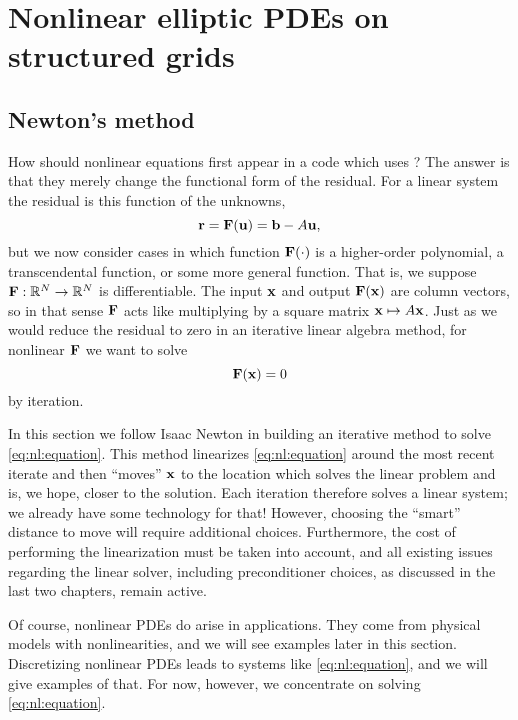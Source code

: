 \renewcommand{\CODELOC}{c/ch4/}

\chapter{Nonlinear elliptic PDEs on structured grids}
\label{chap:nonlinear}

\section{Newton's method}

How should nonlinear equations first appear in a code which uses \PETSc?  The answer is that they merely change the functional form of the residual.  For a linear system the residual is this function of the unknowns,
\begin{equation}
\mathbf{r} = \mathbf{F}(\mathbf{u}) = \mathbf{b} - A \mathbf{u}, \label{eq:nl:linres}
\end{equation}
but we now consider cases in which function $\mathbf{F}(\cdot)$ is a higher-order polynomial, a transcendental function, or some more general function.  That is, we suppose $\mathbf{F} : \mathbb{R}^N \to \mathbb{R}^N$ is differentiable.  The input $\mathbf{x}$ and output $\mathbf{F}(\mathbf{x})$ are column vectors, so in that sense $\mathbf{F}$ acts like multiplying by a square matrix $\mathbf{x}\mapsto A\mathbf{x}$.  Just as we would reduce the residual to zero in an iterative linear algebra method, for nonlinear $\mathbf{F}$ we want to solve
\begin{equation}
   \mathbf{F}(\mathbf{x}) = 0   \label{eq:nl:equation}
\end{equation}
by iteration.

In this section we follow Isaac Newton in building an iterative method to solve \eqref{eq:nl:equation}.  This method linearizes \eqref{eq:nl:equation} around the most recent iterate and then ``moves'' $\mathbf{x}$ to the location which solves the linear problem and is, we hope, closer to the solution.  Each iteration therefore solves a linear system; we already have some \PETSc technology for that!  However, choosing the ``smart'' distance to move will require additional choices.  Furthermore, the cost of performing the linearization must be taken into account, and all existing issues regarding the linear solver, including preconditioner choices, as discussed in the last two chapters, remain active.

Of course, nonlinear PDEs do arise in applications.  They come from physical models with nonlinearities, and we will see examples later in this section.  Discretizing nonlinear PDEs leads to systems like \eqref{eq:nl:equation}, and we will give examples of that.  For now, however, we concentrate on solving \eqref{eq:nl:equation}.

